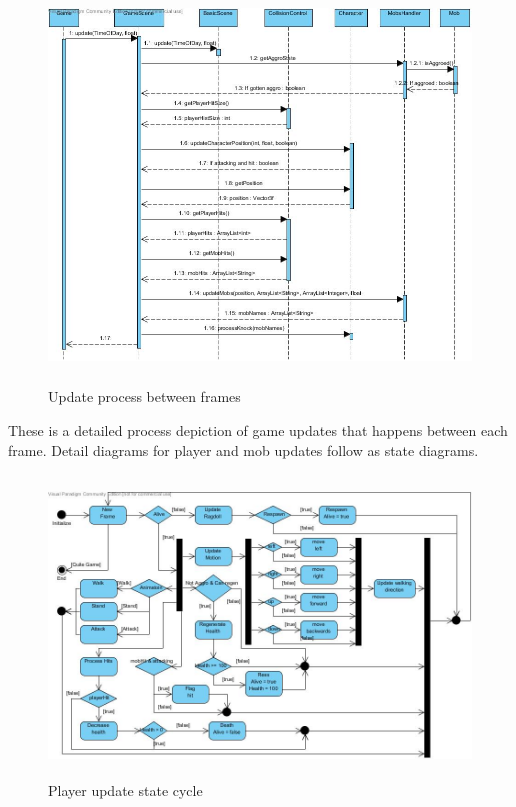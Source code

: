 \documentclass[letterpaper]{article}
\begin{document}
					\begin{figure}[H]
					\centering
					\includegraphics[width=180mm, height=105mm]{UML_Diagram/Sequence/Update_Sequence.jpg}
					\caption{Update process between frames}
					\label{overflow}
					\end{figure}
					
					These is a detailed process depiction of game updates that happens between each frame. Detail diagrams for player and mob updates follow as state diagrams.
					
					\begin{figure}[H]
					\centering
					\includegraphics[width=180mm, height=80mm]{UML_Diagram/State/Player_State.jpg}
					\caption{Player update state cycle}
					\label{overflow}
					\end{figure}
					
\end{document}
